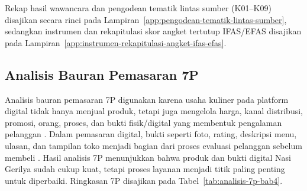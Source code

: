 Rekap hasil wawancara dan pengodean tematik lintas sumber (K01--K09) disajikan secara rinci pada Lampiran~\ref{app:pengodean-tematik-lintas-sumber}, sedangkan instrumen dan rekapitulasi skor angket tertutup IFAS/EFAS disajikan pada Lampiran~\ref{app:instrumen-rekapitulasi-angket-ifas-efas}.

\subsection{Analisis Bauran Pemasaran 7P}
Analisis bauran pemasaran 7P digunakan karena usaha kuliner pada platform digital tidak hanya menjual produk, tetapi juga mengelola harga, kanal distribusi, promosi, orang, proses, dan bukti fisik/digital yang membentuk pengalaman pelanggan \parencite{kotler2023principlesmarketing,wirtz2024servicesmarketing}. Dalam pemasaran digital, bukti seperti foto, rating, deskripsi menu, ulasan, dan tampilan toko menjadi bagian dari proses evaluasi pelanggan sebelum membeli \parencite{chaffey2022digitalmarketing}. Hasil analisis 7P menunjukkan bahwa produk dan bukti digital Nasi Gerilya sudah cukup kuat, tetapi proses layanan menjadi titik paling penting untuk diperbaiki. Ringkasan 7P disajikan pada Tabel~\ref{tab:analisis-7p-bab4}.


